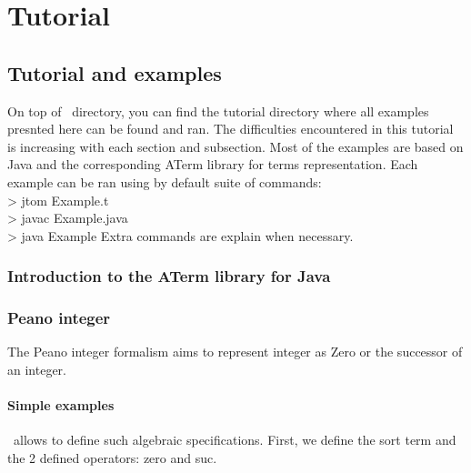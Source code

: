 \part{Tutorial}
\chapter{Tutorial and examples}

On top of \TOM\ directory, you can find the tutorial directory where
all examples presnted here can be found and ran.
The difficulties encountered in this tutorial is increasing with each
section and subsection. Most of the examples are based on Java and the
corresponding ATerm library for terms representation.
Each example can be ran using by default suite of commands:
\\> jtom Example.t
\\> javac Example.java
\\> java Example
Extra commands are explain when necessary.

\section{Introduction to the ATerm library for Java}

\section{Peano integer}

The Peano integer formalism aims to represent integer as Zero or the
successor of an integer.
\subsection{Simple examples}
\TOM\ allows to define such algebraic specifications. First, we define
the sort term and the 2 defined operators: zero and suc.

